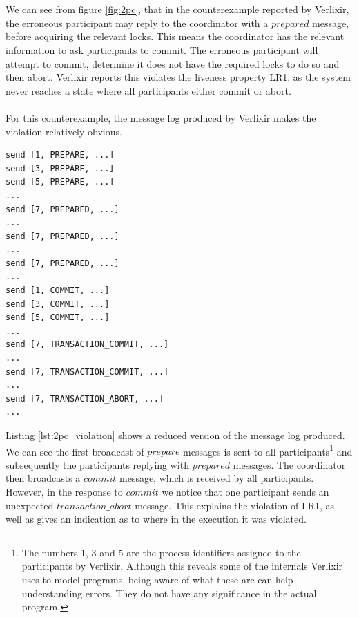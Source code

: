 \\ \\
We can see from figure \ref{fig:2pc}, that in the counterexample reported by Verlixir, the erroneous participant may reply to the coordinator with a $prepared$ message, before acquiring the relevant locks. This means the coordinator has the relevant information to ask participants to commit. The erroneous participant will attempt to commit, determine it does not have the required locks to do so and then abort. Verlixir reports this violates the liveness property LR1, as the system never reaches a state where all participants either commit or abort.
\\ \\
For this counterexample, the message log produced by Verlixir makes the violation relatively obvious.
\begin{lstlisting}[xleftmargin=.01\linewidth, xrightmargin=0.01\linewidth, caption={Message log produced by counterexample violating LR1.}, label={lst:2pc_violation}]
send [1, PREPARE, ...]
send [3, PREPARE, ...]
send [5, PREPARE, ...]
...
send [7, PREPARED, ...]
...
send [7, PREPARED, ...]
...
send [7, PREPARED, ...]
...
send [1, COMMIT, ...]
send [3, COMMIT, ...]
send [5, COMMIT, ...]
...
send [7, TRANSACTION_COMMIT, ...]
...
send [7, TRANSACTION_COMMIT, ...]
...
send [7, TRANSACTION_ABORT, ...]
...
\end{lstlisting}
Listing \ref{lst:2pc_violation} shows a reduced version of the message log produced. We can see the first broadcast of $prepare$ messages is sent to all participants\footnote{The numbers 1, 3 and 5 are the process identifiers assigned to the participants by Verlixir. Although this reveals some of the internals Verlixir uses to model programs, being aware of what these are can help understanding errors. They do not have any significance in the actual program.} and subsequently the participants replying with $prepared$ messages. The coordinator then broadcasts a $commit$ message, which is received by all participants. However, in the response to $commit$ we notice that one participant sends an unexpected $transaction\_abort$ message. This explains the violation of LR1, as well as gives an indication as to where in the execution it was violated.
